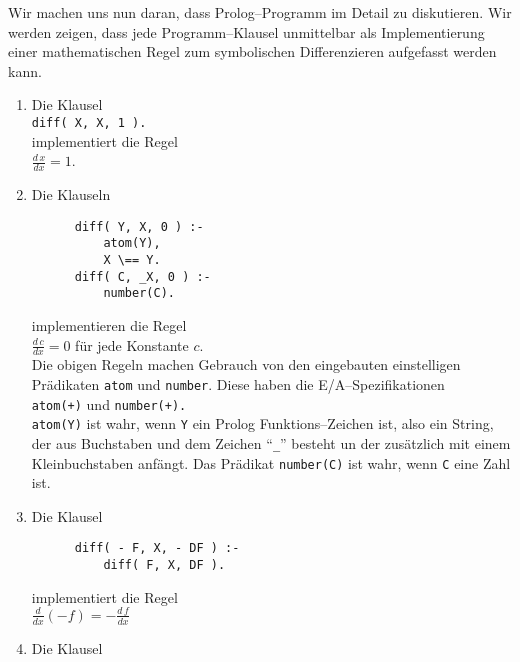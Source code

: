 Wir machen uns nun daran, dass Prolog--Programm im Detail zu diskutieren.
Wir werden zeigen, dass jede Programm--Klausel unmittelbar als Implementierung einer mathematischen
Regel zum symbolischen Differenzieren aufgefasst werden kann.
\begin{enumerate}
\item Die Klausel \\[0.1cm]
      \hspace*{1.3cm} {\tt diff( X, X, 1 ).} \\[0.1cm]
      implementiert die Regel \\[0.1cm]
      \hspace*{1.3cm} $\frac{d\,x}{dx} = 1$.
\item Die Klauseln
      \vspace{-0.3cm}

      \begin{verbatim}
      diff( Y, X, 0 ) :- 
          atom(Y),
          X \== Y.
      diff( C, _X, 0 ) :-
          number(C).
      \end{verbatim}
      \vspace*{-0.7cm}

      implementieren die Regel \\[0.1cm]
      \hspace*{1.3cm} $\frac{d\,c}{dx} = 0$ \quad f\"{u}r jede Konstante $c$. \\[0.1cm]
      Die obigen Regeln machen Gebrauch von den eingebauten einstelligen Pr\"{a}dikaten \texttt{atom}
      und \texttt{number}.  Diese haben die E/A--Spezifikationen \\[0.1cm]
      \hspace*{1.3cm} \texttt{atom(+)} und \texttt{number(+).} \\[0.1cm]
      \texttt{atom(Y)} ist wahr, wenn \texttt{Y} ein Prolog Funktions--Zeichen ist, also ein String,
      der aus Buchstaben und dem Zeichen ``\texttt{\_}'' besteht un der zus\"{a}tzlich mit einem 
      Kleinbuchstaben anf\"{a}ngt.  Das Pr\"{a}dikat \texttt{number(C)} ist wahr, wenn \texttt{C} eine Zahl ist.
\item Die Klausel
      \vspace*{-0.3cm}

      \begin{verbatim}
      diff( - F, X, - DF ) :-
          diff( F, X, DF ).
      \end{verbatim}
      \vspace*{-0.7cm}

      implementiert die Regel \\[0.1cm]
      \hspace*{1.3cm} $\frac{d}{dx}(-f) = - \frac{d\,f}{dx}$
\item Die Klausel
      \vspace*{-0.3cm}


\end{enumerate}
